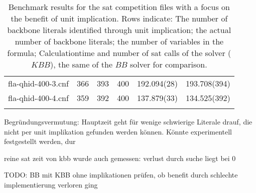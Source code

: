 \begin{table}
\begin{tabular}{l| c c c c c }
fla-qhid-400-3.cnf & 366 & 393 & 400 & 192.094(28) & 193.708(394) \\
fla-qhid-400-4.cnf & 359 & 392 & 400 & 137.879(33) & 134.525(392) \\
\fi
\hline
\end{tabular}
\caption{Benchmark results for the sat competition files with a focus on the benefit of unit implication.
Rows indicate: The number of backbone literals identified through unit implication; the actual number of backbone literals; the number of variables in the formula; Calculationtime and number of sat calls of the solver ($KBB$), the same of the $BB$ solver for comparison.}
\end{table}

Begründungsvermutung: Hauptzeit geht für wenige schwierige Literale drauf, die nicht per unit implikation gefunden werden können. Könnte experimentell festgestellt werden, dur

reine sat zeit von kbb wurde auch gemessen: verlust durch suche liegt bei 0

TODO: BB mit KBB ohne implikationen prüfen, ob benefit durch schlechte implementierung verloren ging